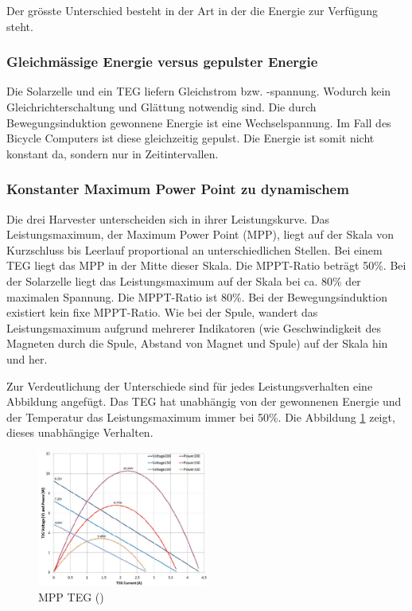 Der grösste Unterschied besteht in der Art in der die Energie zur Verfügung steht. 

\subsubsection{Gleichmässige Energie versus gepulster Energie}

Die Solarzelle und ein TEG liefern Gleichstrom bzw. -spannung. Wodurch kein Gleichrichterschaltung und Glättung notwendig sind. Die durch Bewegungsinduktion gewonnene Energie ist eine Wechselspannung. Im Fall des Bicycle Computers ist diese gleichzeitig gepulst. Die Energie ist somit nicht konstant da, sondern nur in Zeitintervallen.

\subsubsection{Konstanter Maximum Power Point zu dynamischem}
\label{mpp_theorie_diff}

Die drei Harvester unterscheiden sich in ihrer Leistungskurve. Das Leistungsmaximum, der Maximum Power Point (MPP), liegt auf der Skala von Kurzschluss bis Leerlauf proportional an unterschiedlichen Stellen.  Bei einem TEG liegt das MPP in der Mitte dieser Skala. Die MPPT-Ratio beträgt 50\thinspace\%. Bei der Solarzelle liegt das Leistungsmaximum auf der Skala bei ca. 80\thinspace\% der maximalen Spannung. Die MPPT-Ratio ist 80\thinspace\%.  Bei der Bewegungsinduktion existiert kein fixe MPPT-Ratio. Wie bei der Spule, wandert das Leistungsmaximum aufgrund mehrerer Indikatoren (wie Geschwindigkeit des Magneten durch die Spule, Abstand von Magnet und Spule) auf der Skala hin und her.

Zur Verdeutlichung der Unterschiede sind für jedes Leistungsverhalten eine Abbildung angefügt. Das TEG hat unabhängig von der gewonnenen Energie und der Temperatur das Leistungsmaximum immer bei 50\thinspace\%. Die Abbildung \ref{teg} zeigt, dieses unabhängige Verhalten. 

\begin{figure}[ht]
 \includegraphics[width=0.5\textwidth]{2TheoretischeGrundlagen/imag/MPPTEG.png}
\caption{MPP TEG (\cite{MPP_TEG})}
\label{teg} 
\end{figure}


